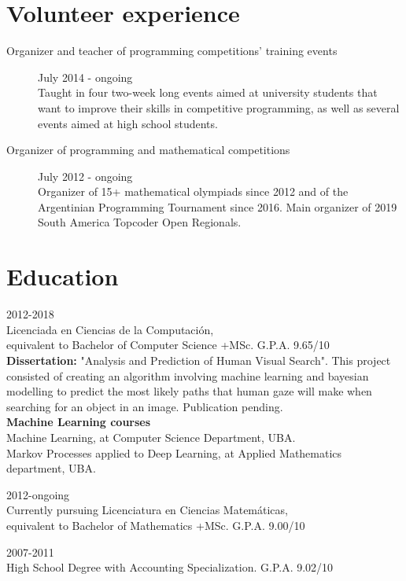 \documentclass [a4paper, 11pt]{article}
\begin{document}
\section* {Volunteer experience}
\begin{description}
\item[Organizer and teacher of programming competitions' training events] {\hfill July 2014 - ongoing \\
  Taught in four two-week long events aimed at university students that 
  want to improve their skills in competitive programming, as well as 
  several events aimed at high school students.
}
\item[Organizer of programming and mathematical competitions] { \hfill July 2012 - ongoing \\
  Organizer of 15+ mathematical olympiads since 2012 and of the Argentinian Programming Tournament since 2016. Main organizer of 2019 South America Topcoder Open Regionals.
}
\end{description}

\section* {Education}
\begin{description}
  \item[University of Buenos Aires]{\hfill 2012-2018 \\
	Licenciada en Ciencias de la Computaci\'on, \\
	equivalent to Bachelor of Computer Science +MSc. G.P.A. 9.65/10 \\
    
    \textbf{Dissertation:} "Analysis and Prediction of Human Visual Search". This project consisted of creating an 
    algorithm involving machine learning and bayesian modelling to predict the most likely paths that 
    human gaze will make when searching for an object in an image. Publication pending.\\

    \textbf{Machine Learning courses} { \hfill \\
      Machine Learning, at Computer Science Department, UBA. \\ %
      Markov Processes applied to Deep Learning, at Applied Mathematics department, UBA. \\
    }

  \item[University of Buenos Aires]{\hfill 2012-ongoing \\ 
	Currently pursuing Licenciatura en Ciencias Matem\'aticas, \\
	equivalent to Bachelor of Mathematics +MSc. G.P.A. 9.00/10}
	
  \item[Superior School in Commerce ``Carlos Pellegrini'' - University of Buenos Aires] {\hfill 2007-2011 \\
	High School Degree with Accounting Specialization. G.P.A. 9.02/10}

}

\end{description}
\end{document}
